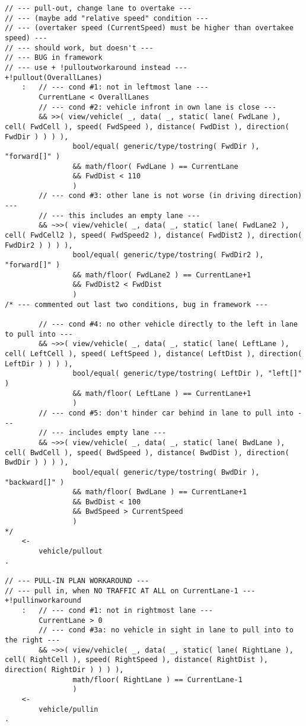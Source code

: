 \begin{lstlisting}
// --- pull-out, change lane to overtake ---
// --- (maybe add "relative speed" condition ---
// --- (overtaker speed (CurrentSpeed) must be higher than overtakee speed) ---
// --- should work, but doesn't ---
// --- BUG in framework
// --- use + !pulloutworkaround instead ---
+!pullout(OverallLanes)
    :   // --- cond #1: not in leftmost lane ---
        CurrentLane < OverallLanes 
        // --- cond #2: vehicle infront in own lane is close ---
        && >>( view/vehicle( _, data( _, static( lane( FwdLane ), cell( FwdCell ), speed( FwdSpeed ), distance( FwdDist ), direction( FwdDir ) ) ) ),
                bool/equal( generic/type/tostring( FwdDir ), "forward[]" ) 
                && math/floor( FwdLane ) == CurrentLane
                && FwdDist < 110 
                )
        // --- cond #3: other lane is not worse (in driving direction) ---
        // --- this includes an empty lane ---
        && ~>>( view/vehicle( _, data( _, static( lane( FwdLane2 ), cell( FwdCell2 ), speed( FwdSpeed2 ), distance( FwdDist2 ), direction( FwdDir2 ) ) ) ),
                bool/equal( generic/type/tostring( FwdDir2 ), "forward[]" ) 
                && math/floor( FwdLane2 ) == CurrentLane+1
                && FwdDist2 < FwdDist 
                )
/* --- commented out last two conditions, bug in framework --- 

        // --- cond #4: no other vehicle directly to the left in lane to pull into ---
        && ~>>( view/vehicle( _, data( _, static( lane( LeftLane ), cell( LeftCell ), speed( LeftSpeed ), distance( LeftDist ), direction( LeftDir ) ) ) ),
                bool/equal( generic/type/tostring( LeftDir ), "left[]" ) 
                && math/floor( LeftLane ) == CurrentLane+1
                )
        // --- cond #5: don't hinder car behind in lane to pull into ---
        // --- includes empty lane ---
        && ~>>( view/vehicle( _, data( _, static( lane( BwdLane ), cell( BwdCell ), speed( BwdSpeed ), distance( BwdDist ), direction( BwdDir ) ) ) ),
                bool/equal( generic/type/tostring( BwdDir ), "backward[]" ) 
                && math/floor( BwdLane ) == CurrentLane+1
                && BwdDist < 100
                && BwdSpeed > CurrentSpeed 
                )
*/
    <-
        vehicle/pullout
.

// --- PULL-IN PLAN WORKAROUND ---
// --- pull in, when NO TRAFFIC AT ALL on CurrentLane-1 --- 
+!pullinworkaround
    :   // --- cond #1: not in rightmost lane ---
        CurrentLane > 0
        // --- cond #3a: no vehicle in sight in lane to pull into to the right ---
        && ~>>( view/vehicle( _, data( _, static( lane( RightLane ), cell( RightCell ), speed( RightSpeed ), distance( RightDist ), direction( RightDir ) ) ) ),
                math/floor( RightLane ) == CurrentLane-1 
                )
    <-
        vehicle/pullin
.


\end{lstlisting}
